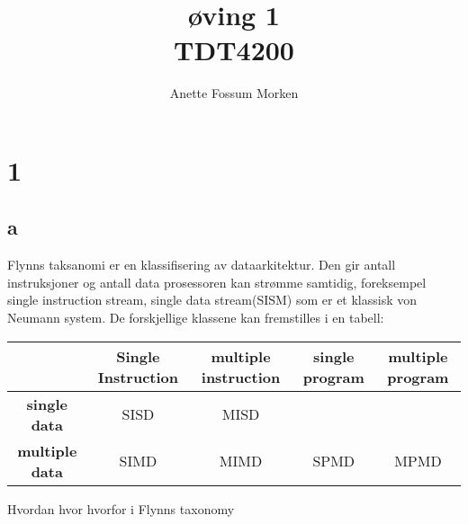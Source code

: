 \documentclass[12pt, a4paper]{article} %
\title{øving 1 \\ TDT4200}
\author[1]{Anette Fossum Morken}
\date{}
\begin{document}
\maketitle

\section*{1}
\subsection*{a}
Flynns taksanomi er en klassifisering av dataarkitektur. Den gir antall instruksjoner og antall data prosessoren kan strømme samtidig, foreksempel single instruction stream, single data stream(SISM) som er et klassisk von Neumann system. De forskjellige klassene kan fremstilles i en tabell:

  \begin{tabular}{|@{}c@{}| @{}c@{} |@{}c@{}|@{} c@{} |@{}c@{}| }
    \hline
     & \textbf{Single Instruction} & \textbf{multiple instruction} & \textbf{single program} & \textbf{multiple program} \\ \hline
    \textbf{single data} & SISD & MISD & &  \\ \hline
    \textbf{multiple data} & SIMD & MIMD & SPMD & MPMD \\
    \hline
  \end{tabular}


Hvordan 
hvor 
hvorfor i Flynns taxonomy
\end{document}
